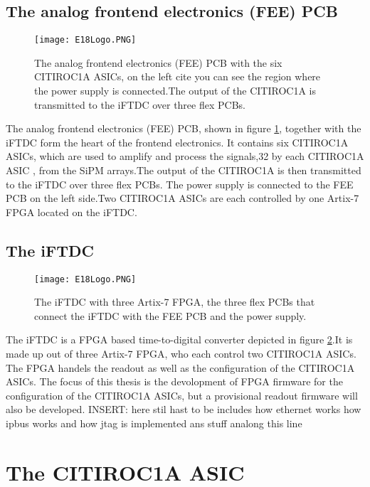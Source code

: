 \subsection{The analog frontend electronics (FEE) PCB}
\begin{figure}[H]
    \centering
    \texttt{[image: E18Logo.PNG]}
    \caption{The analog frontend electronics (FEE) PCB with the six CITIROC1A ASICs, on the left cite you can see the region where the power supply is connected.The output of the CITIROC1A is transmitted to the iFTDC over three flex PCBs.\autocite{InternalcommunicationKarl}}
    \label{fig:FEE}
\end{figure}
The analog frontend electronics (FEE) PCB, shown in figure \ref{fig:FEE}, together with the iFTDC form the heart of the frontend electronics.
It contains six CITIROC1A ASICs, which are used to amplify and process the signals,32 by each CITIROC1A ASIC , from the SiPM arrays.The output of the CITIROC1A is then transmitted to the iFTDC over three flex PCBs.
The power supply is connected to the FEE PCB on the left side.Two CITIROC1A ASICs are each controlled by one Artix-7 FPGA located on the iFTDC.\autocite{InternalcommunicationIgor}
\subsection{The iFTDC}
\begin{figure}[H]
    \centering
    \texttt{[image: E18Logo.PNG]}
    \caption{The iFTDC with three Artix-7 FPGA, the three flex PCBs that connect the iFTDC with the FEE PCB and the power supply.\autocite{InternalcommunicationIgor}}
    \label{fig:iFTDC}
\end{figure}

The iFTDC is a FPGA based time-to-digital converter depicted in figure \ref{fig:iFTDC}.It is made up out of three Artix-7 FPGA, who each control two CITIROC1A ASICs.
The FPGA handels the readout as well as the configuration of the CITIROC1A ASICs\autocite{InternalcommunicationIgor}.
The focus of this thesis is the devolopment of FPGA firmware for the configuration of the CITIROC1A ASICs, but a provisional readout firmware will also be developed.
\newline
INSERT: here stil hast to be includes how ethernet works how ipbus works and how jtag is implemented ans stuff analong this line 
\section{The CITIROC1A ASIC}
